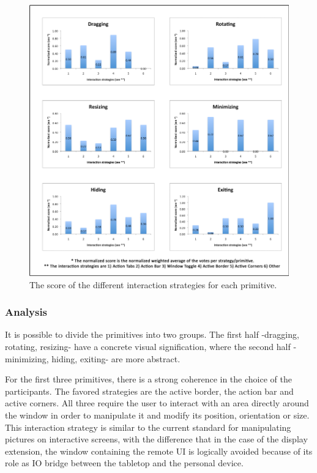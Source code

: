 \begin{figure}[h!]
  \centering
    \includegraphics[width=1\textwidth]{images/primHistog}
    \caption{The score of the different interaction strategies for each primitive.}
	\label{primitives}    
\end{figure}

\subsubsection{Analysis}

It is possible to divide the primitives into two groups.
The first half -dragging, rotating, resizing- have a concrete visual signification, where the second half - minimizing, hiding, exiting- are more abstract.

For the first three primitives, there is a strong coherence in the choice of the participants.
The favored strategies are the active border, the action bar and active corners.
All three require the user to interact with an area directly around the window in order to manipulate it and modify its position, orientation or size.
This interaction strategy is similar to the current standard for manipulating pictures on interactive screens, with the difference that in the case of the display extension, the window containing the remote UI is logically avoided because of its role as IO bridge between the tabletop and the personal device.

